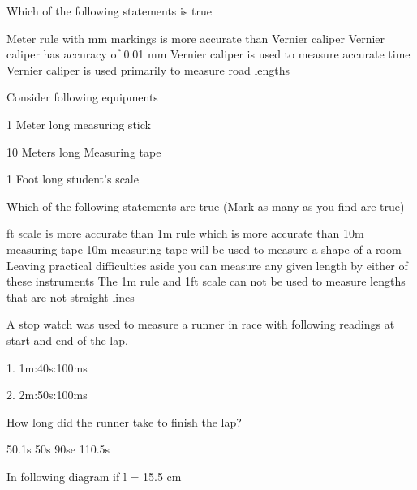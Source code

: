 \documentclass[12pt,addpoints]{exam}
\begin{document}
\begin{questions}

\myquestion[1] Which of the following statements is true
	\begin{choices}
	\choice Meter rule with mm markings is more accurate than Vernier caliper
	\correctchoice Vernier caliper has accuracy of 0.01 mm
	\choice Vernier caliper is used to measure accurate time
	\choice Vernier caliper is used primarily to measure road lengths
	\end{choices}


\myquestion[4] Consider following equipments


1 Meter long measuring stick

10 Meters long Measuring tape

1 Foot long student's scale


Which of the following statements are true (Mark as many as you find are true)


	\begin{choices}
	 ft scale is more accurate than 1m rule which is more accurate than 10m measuring tape
	\correctchoice 10m measuring tape will be used to measure a shape of a room
	\choice Leaving practical difficulties aside you can measure any given length by either of these instruments
	\correctchoice The 1m rule and 1ft scale can not be used to measure lengths that are not straight lines
	\end{choices}


	\myquestion[1] A stop watch was used to measure a runner in race with following readings at start and end of the lap.

    1.	1m:40s:100ms

	2.	2m:50s:100ms

	How long did the runner take to finish the lap?

	\begin{choices}
	\choice 50.1s
	\correctchoice 50s
	\choice 90se
	\choice 110.5s
  \end{choices}

\myquestion[1] In following diagram if l = 15.5 cm



\end{questions}
\end{document}

